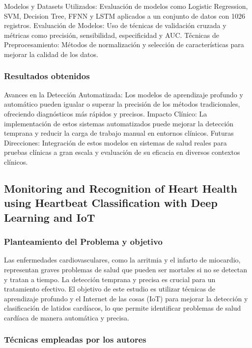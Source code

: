Modelos y Datasets Utilizados: Evaluación de modelos como Logistic Regression, SVM, Decision Tree, FFNN y LSTM aplicados a un conjunto de datos con 1026 registros.
Evaluación de Modelos: Uso de técnicas de validación cruzada y métricas como precisión, sensibilidad, especificidad y AUC.
Técnicas de Preprocesamiento: Métodos de normalización y selección de características para mejorar la calidad de los datos.

\subsubsection{Resultados obtenidos}

Avances en la Detección Automatizada: Los modelos de aprendizaje profundo y automático pueden igualar o superar la precisión de los métodos tradicionales, ofreciendo diagnósticos más rápidos y precisos.
Impacto Clínico: La implementación de estos sistemas automatizados puede mejorar la detección temprana y reducir la carga de trabajo manual en entornos clínicos.
Futuras Direcciones: Integración de estos modelos en sistemas de salud reales para pruebas clínicas a gran escala y evaluación de su eficacia en diversos contextos clínicos.

\subsection{Monitoring and Recognition of Heart Health using Heartbeat Classification with Deep Learning and IoT}

\subsubsection{Planteamiento del Problema y objetivo}

Las enfermedades cardiovasculares, como la arritmia y el infarto de miocardio, representan graves problemas de salud que pueden ser mortales si no se detectan y tratan a tiempo. La detección temprana y precisa es crucial para un tratamiento efectivo. El objetivo de este estudio es utilizar técnicas de aprendizaje profundo y el Internet de las cosas (IoT) para mejorar la detección y clasificación de latidos cardíacos, lo que permite identificar problemas de salud cardíaca de manera automática y precisa.

\subsubsection{Técnicas empleadas por los autores}

